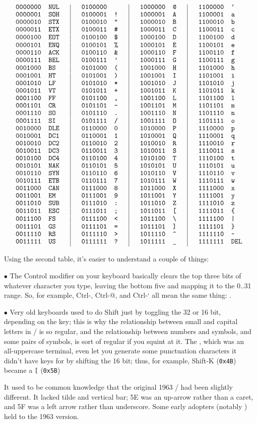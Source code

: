$$\vbox{\tt\offinterlineskip
\halign{%
#\hfil&\quad#\hfil&\hskip1.5em\vrule height 1.5ex depth1ex\hskip1.5em#\hfil&\quad#\hfil%
&\hskip1.5em\vrule\hskip1.5em#\hfil&\quad#\hfil%
&\hskip1.5em\vrule\hskip1.5em#\hfil&\quad#\hfil\cr
0000000&NUL&0100000&&1000000&@&1100000&`\cr
0000001&SOH&0100001&!&1000001&A&1100001&a\cr
0000010&STX&0100010&"&1000010&B&1100010&b\cr
0000011&ETX&0100011&\#&1000011&C&1100011&c\cr
0000100&EOT&0100100&\$&1000100&D&1100100&d\cr
0000101&ENQ&0100101&\%&1000101&E&1100101&e\cr
0000110&ACK&0100110&\&&1000110&F&1100110&f\cr
0000111&BEL&0100111&'&1000111&G&1100111&g\cr
0001000&BS&0101000&(&1001000&H&1101000&h\cr
0001001&HT&0101001&)&1001001&I&1101001&i\cr
0001010&LF&0101010&*&1001010&J&1101010&j\cr
0001011&VT&0101011&+&1001011&K&1101011&k\cr
0001100&FF&0101100&,&1001100&L&1101100&l\cr
0001101&CR&0101101&-&1001101&M&1101101&m\cr
0001110&SO&0101110&.&1001110&N&1101110&n\cr
0001111&SI&0101111&/&1001111&O&1101111&o\cr
0010000&DLE&0110000&0&1010000&P&1110000&p\cr
0010001&DC1&0110001&1&1010001&Q&1110001&q\cr
0010010&DC2&0110010&2&1010010&R&1110010&r\cr
0010011&DC3&0110011&3&1010011&S&1110011&s\cr
0010100&DC4&0110100&4&1010100&T&1110100&t\cr
0010101&NAK&0110101&5&1010101&U&1110101&u\cr
0010110&SYN&0110110&6&1010110&V&1110110&v\cr
0010111&ETB&0110111&7&1010111&W&1110111&w\cr
0011000&CAN&0111000&8&1011000&X&1111000&x\cr
0011001&EM&0111001&9&1011001&Y&1111001&y\cr
0011010&SUB&0111010&:&1011010&Z&1111010&z\cr
0011011&ESC&0111011&;&1011011&[&1111011&\char`\{\cr
0011100&FS&0111100&<&1011100&\char`\\&1111100&|\cr
0011101&GS&0111101&=&1011101&]&1111101&\char`\}\cr
0011110&RS&0111110&>&1011110&\char`^&1111110&\char`\~\cr
0011111&US&0111111&?&1011111&\char`_&1111111&DEL\cr
}}$$

\noindent Using the second table, it's easier to understand a couple of things:
{\medbreak\narrower
\item{$\bullet$} The Control modifier on your keyboard basically clears the top
three bits of whatever character you type, leaving the bottom five and mapping
it to the 0..31 range. So, for example, Ctrl-, Ctrl-@, and Ctrl-` all mean
the same thing: .

\item{$\bullet$} Very old keyboards used to do Shift just by toggling the 32 or
16 bit, depending on the key; this is why the relationship between small and
capital letters in \ASCII/ is so regular, and the relationship between numbers
and symbols, and some pairs of symbols, is sort of regular if you squint at it.
The , which was an all-uppercase terminal, even let you generate some
punctuation characters it didn't have keys for by shifting the 16 bit; thus,
for example, Shift-K ({\tt 0x4B}) became a {\tt [} ({\tt 0x5B})
\medbreak}
\noindent It used to be common knowledge that the original 1963 \ASCII/ had been
slightly different. It lacked tilde and vertical bar; 5E was an up-arrow rather
than a caret, and 5F was a left arrow rather than underscore. Some early
adopters (notably ) held to the 1963 version.

